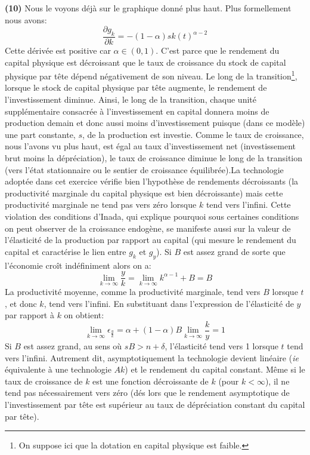 \documentclass[10pt,a4paper,notitlepage]{article}
\newcommand{\question}[1]{\textbf{(#1)}}
\begin{document}
\question{10} Nous le voyons déjà sur le graphique donné plus
haut. Plus formellement nous avons:
\[
\frac{\partial g_k}{\partial k} = -(1-\alpha) s k(t)^{\alpha-2}
\]
Cette dérivée est positive car $\alpha\in(0,1)$. C'est parce que le
rendement du capital physique est décroissant que le taux de
croissance du stock de capital physique par tête dépend négativement
de son niveau. Le long de la transition\footnote{On suppose ici que la
  dotation en capital physique est faible.}, lorsque le stock de
capital physique par tête augmente, le rendement de l'investissement
diminue. Ainsi, le long de la transition, chaque unité supplémentaire
consacrée à l'investissement en capital donnera moins de production
demain et donc aussi moins d'investissement puisque (dans ce modèle)
une part constante, $s$, de la production est investie. Comme le taux
de croissance, nous l'avons vu plus haut, est égal au taux
d'investissement net (investissement brut moins la dépréciation), le
taux de croissance diminue le long de la transition (vers l'état
stationnaire ou le sentier de croissance équilibrée).\newline La
technologie adoptée dans cet exercice vérifie bien l'hypothèse de
rendements décroissants (la productivité marginale du capital physique
est bien décroissante) mais cette productivité marginale ne tend pas
vers zéro lorsque $k$ tend vers l'infini. Cette violation des
conditions d'Inada, qui explique pourquoi sous certaines conditions on
peut observer de la croissance endogène, se manifeste aussi sur la
valeur de l'élasticité de la production par rapport au capital (qui
mesure le rendement du capital et caractérise le lien entre $g_k$ et
$g_y$). Si $B$ est assez grand de sorte que l'économie croît
indéfiniment alors on a:
\[
\lim_{k\rightarrow\infty}\frac{y}{k} =\lim_{k\rightarrow\infty} k^{\alpha-1}+B=B
\]
La productivité moyenne, comme la productivité marginale, tend vers
$B$ lorsque $t$, et donc $k$, tend vers l'infini. En substituant dans
l'expression de l'élasticité de $y$ par rapport à $k$ on obtient:
\[
\lim_{k\rightarrow\infty}\epsilon_{\frac{y}{k}} = \alpha +
(1-\alpha)B\lim_{k\rightarrow\infty}\frac{k}{y} = 1
\]
Si $B$ est assez grand, au sens où $sB>n+\delta$, l'élasticité tend
vers 1 lorsque $t$ tend vers l'infini. Autrement dit, asymptotiquement
la technologie devient linéaire (\emph{ie} équivalente à une
technologie $Ak$) et le rendement du capital constant. Même si le taux
de croissance de $k$ est une fonction décroissante de $k$ (pour
$k<\infty$), il ne tend pas nécessairement vers zéro (dés lors que le
rendement asymptotique de l'investissement par tête est supérieur au taux de
dépréciation constant du capital par tête).\newline
\end{document}
